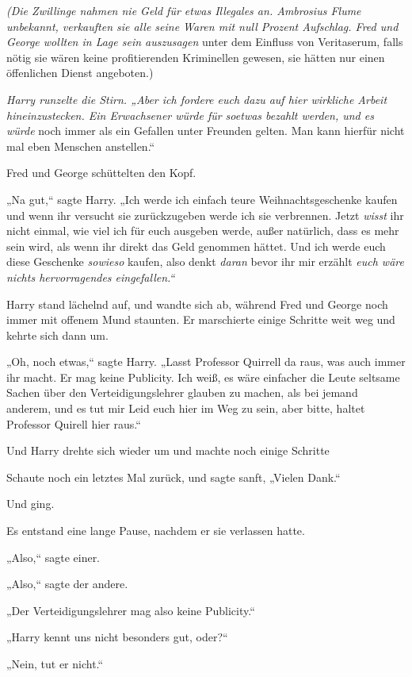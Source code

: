 {\emph{(Die Zwillinge nahmen nie Geld für etwas Illegales an. Ambrosius Flume unbekannt, verkauften sie alle seine Waren mit null Prozent Aufschlag. Fred und George wollten in Lage sein auszusagen \later} unter dem Einfluss von Veritaserum, falls nötig \later sie wären keine profitierenden Kriminellen gewesen, sie hätten nur einen öffenlichen Dienst angeboten.)

\emph{Harry runzelte die Stirn. „Aber ich fordere euch dazu auf hier wirkliche Arbeit hineinzustecken. Ein Erwachsener würde für soetwas bezahlt werden, und es würde} noch immer als ein Gefallen unter Freunden gelten. Man kann hierfür nicht mal eben Menschen anstellen.“

Fred und George schüttelten den Kopf.

„Na gut,“ sagte Harry. „Ich werde ich einfach teure Weihnachtsgeschenke kaufen und wenn ihr versucht sie zurückzugeben werde ich sie verbrennen. Jetzt \emph{wisst} ihr nicht einmal, wie viel ich für euch ausgeben werde, außer natürlich, dass es mehr sein wird, als wenn ihr direkt das Geld genommen hättet. Und ich werde euch diese Geschenke \emph{sowieso} kaufen, also denkt \emph{daran} bevor ihr mir erzählt \emph{euch wäre nichts hervorragendes eingefallen.“}

Harry stand lächelnd auf, und wandte sich ab, während Fred und George noch immer mit offenem Mund staunten. Er marschierte einige Schritte weit weg und kehrte sich dann um.

„Oh, noch etwas,“ sagte Harry. „Lasst Professor Quirrell da raus, was auch immer ihr macht. Er mag keine Publicity. Ich weiß, es wäre einfacher die Leute seltsame Sachen über den Verteidigungslehrer glauben zu machen, als bei jemand anderem, und es tut mir Leid euch hier im Weg zu sein, aber bitte, haltet Professor Quirell hier raus.“

Und Harry drehte sich wieder um und machte noch einige Schritte \later

Schaute noch ein letztes Mal zurück, und sagte sanft, „Vielen Dank.“

Und ging.

Es entstand eine lange Pause, nachdem er sie verlassen hatte.

„Also,“ sagte einer.

„Also,“ sagte der andere.

„Der Verteidigungslehrer mag also keine Publicity.“

„Harry kennt uns nicht besonders gut, oder?“

„Nein, tut er nicht.“

}
